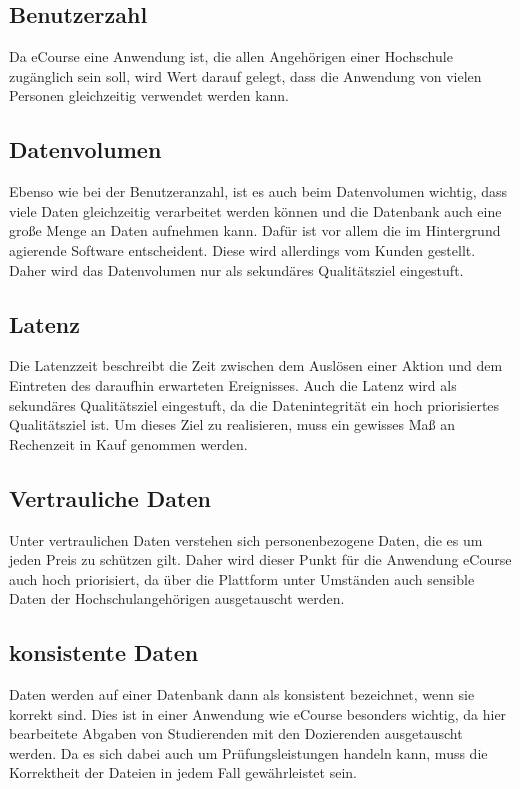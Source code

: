 \subsection{Benutzerzahl}
Da eCourse eine Anwendung ist, die allen Angehörigen einer Hochschule zugänglich sein soll, wird Wert darauf gelegt, dass die Anwendung von vielen Personen gleichzeitig verwendet werden kann.

\subsection{Datenvolumen}
Ebenso wie bei der Benutzeranzahl, ist es auch beim Datenvolumen wichtig, dass viele Daten gleichzeitig verarbeitet werden können und die Datenbank auch eine große Menge an Daten aufnehmen kann. Dafür ist vor allem die im Hintergrund agierende Software entscheident. Diese wird allerdings vom Kunden gestellt. Daher wird das Datenvolumen nur als sekundäres Qualitätsziel eingestuft.

\subsection{Latenz}
Die Latenzzeit beschreibt die Zeit zwischen dem Auslösen einer Aktion und dem Eintreten des daraufhin erwarteten Ereignisses.
Auch die Latenz wird als sekundäres Qualitätsziel eingestuft, da die Datenintegrität ein hoch priorisiertes Qualitätsziel ist. Um dieses Ziel zu realisieren, muss ein gewisses Maß an Rechenzeit in Kauf genommen werden.

\subsection{Vertrauliche Daten}
\label{sec:vertrauen}
Unter vertraulichen Daten verstehen sich personenbezogene Daten, die es um jeden Preis zu schützen gilt. Daher wird dieser Punkt für die Anwendung eCourse auch hoch priorisiert, da über die Plattform unter Umständen auch sensible Daten der Hochschulangehörigen ausgetauscht werden.

\subsection{konsistente Daten}
Daten werden auf einer Datenbank dann als konsistent bezeichnet, wenn sie korrekt sind. Dies ist in einer Anwendung wie eCourse besonders wichtig, da hier \gls{bearbeitete Abgabe}n von \gls{Studierende}n mit den \gls{Dozierende}n ausgetauscht werden. Da es sich dabei auch um Prüfungsleistungen handeln kann, muss die Korrektheit der Dateien in jedem Fall gewährleistet sein.